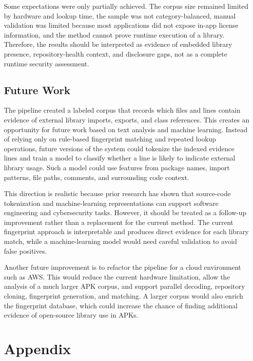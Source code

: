 \documentclass[12pt,a4paper]{report}
\begin{document}
Some expectations were only partially achieved. The corpus size remained limited by hardware and lookup time, the sample was not category-balanced, manual validation was limited because most applications did not expose in-app license information, and the method cannot prove runtime execution of a library. Therefore, the results should be interpreted as evidence of embedded library presence, repository-health context, and disclosure gaps, not as a complete runtime security assessment.

\section{Future Work}
The pipeline created a labeled corpus that records which files and lines contain evidence of external library imports, exports, and class references. This creates an opportunity for future work based on text analysis and machine learning. Instead of relying only on rule-based fingerprint matching and repeated lookup operations, future versions of the system could tokenize the indexed evidence lines and train a model to classify whether a line is likely to indicate external library usage. Such a model could use features from package names, import patterns, file paths, comments, and surrounding code context.

This direction is realistic because prior research has shown that source-code tokenization and machine-learning representations can support software engineering and cybersecurity tasks. However, it should be treated as a follow-up improvement rather than a replacement for the current method. The current fingerprint approach is interpretable and produces direct evidence for each library match, while a machine-learning model would need careful validation to avoid false positives.

Another future improvement is to refactor the pipeline for a cloud environment such as AWS. This would reduce the current hardware limitation, allow the analysis of a much larger APK corpus, and support parallel decoding, repository cloning, fingerprint generation, and matching. A larger corpus would also enrich the fingerprint database, which could increase the chance of finding additional evidence of open-source library use in APKs.

\printbibliography[heading=bibintoc,title={References}]

\appendix
\chapter*{Appendix}
\end{document}
